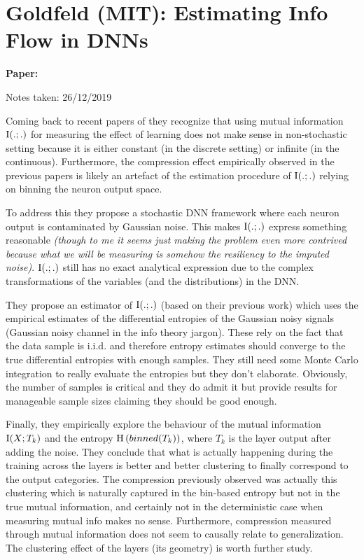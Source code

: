 \clearpage

\section{Goldfeld (MIT): Estimating Info Flow in DNNs}\label{sec:estimInfoFlowDL}

\begin{notebox}
\textbf{Paper: } 

\hfill Notes taken: 26/12/2019 
\end{notebox}

Coming back to recent papers of \cite{shwartz-zivOpeningBlackBox2017,saxeInformationBottleneckTheory2018} they recognize that using mutual information $\mathrm{I}(.;.)$ for measuring the effect of learning does not make sense in non-stochastic setting because it is either constant (in the discrete setting) or infinite (in the continuous).
Furthermore, the compression effect empirically observed in the previous papers is likely an artefact of the estimation procedure of $\mathrm{I}(.;.)$ relying on binning the neuron output space.

To address this they propose a stochastic DNN framework where each neuron output is contaminated by Gaussian noise.
This makes $\mathrm{I}(.;.)$ express something reasonable \emph{(though to me it seems just making the problem even more contrived because what we will be measuring is somehow the resiliency to the imputed noise)}.
$\mathrm{I}(.;.)$ still has no exact analytical expression due to the complex transformations of the variables (and the distributions) in the DNN.

They propose an estimator of $\mathrm{I}(.;.)$ (based on their previous work) which uses the empirical estimates of the differential entropies of the Gaussian noisy signals (Gaussian noisy channel in the info theory jargon).
These rely on the fact that the data sample is i.i.d. and therefore entropy estimates should converge to the true differential entropies with enough samples. They still need some Monte Carlo integration to really evaluate the entropies but they don't elaborate. Obviously, the number of samples is critical and they do admit it but provide results for manageable sample sizes claiming they should be good enough.

Finally, they empirically explore the behaviour of the mutual information $\mathrm{I}(X; T_k)$ and the entropy $\mathrm{H}\left( binned(T_k)\right)$, where $T_k$ is the layer output after adding the noise.
They conclude that what is actually happening during the training across the layers is better and better clustering to finally correspond to the output categories.
The compression previously observed was actually this clustering which is naturally captured in the bin-based entropy but not in the true mutual information, and certainly not in the deterministic case when measuring mutual info makes no sense.
Furthermore, compression measured through mutual information does not seem to causally relate to generalization.
The clustering effect of the layers (its geometry) is worth further study.


